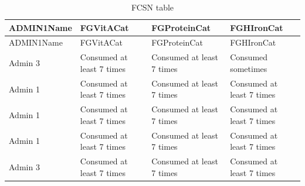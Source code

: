 \documentclass[
  letterpaper,
  DIV=11,
  numbers=noendperiod]{scrreprt}
\begin{document}
\begin{longtable}[]{@{}
  >{\raggedright\arraybackslash}p{}
  >{\raggedright\arraybackslash}p{}
  >{\raggedright\arraybackslash}p{}
  >{\raggedright\arraybackslash}p{}@{}}
\caption{FCSN table}\tabularnewline
\toprule\noalign{}
\begin{minipage}[b]{\linewidth}\raggedright
ADMIN1Name
\end{minipage} & \begin{minipage}[b]{\linewidth}\raggedright
FGVitACat
\end{minipage} & \begin{minipage}[b]{\linewidth}\raggedright
FGProteinCat
\end{minipage} & \begin{minipage}[b]{\linewidth}\raggedright
FGHIronCat
\end{minipage} \\
\midrule\noalign{}
\endfirsthead
\toprule\noalign{}
\begin{minipage}[b]{\linewidth}\raggedright
ADMIN1Name
\end{minipage} & \begin{minipage}[b]{\linewidth}\raggedright
FGVitACat
\end{minipage} & \begin{minipage}[b]{\linewidth}\raggedright
FGProteinCat
\end{minipage} & \begin{minipage}[b]{\linewidth}\raggedright
FGHIronCat
\end{minipage} \\
\midrule\noalign{}
\endhead
\bottomrule\noalign{}
\endlastfoot
Admin 3 & Consumed at least 7 times & Consumed at least 7 times &
Consumed sometimes \\
Admin 1 & Consumed at least 7 times & Consumed at least 7 times &
Consumed at least 7 times \\
Admin 1 & Consumed at least 7 times & Consumed at least 7 times &
Consumed at least 7 times \\
Admin 1 & Consumed at least 7 times & Consumed at least 7 times &
Consumed at least 7 times \\
Admin 3 & Consumed at least 7 times & Consumed at least 7 times &
Consumed at least 7 times \\
\end{longtable}
\end{document}
